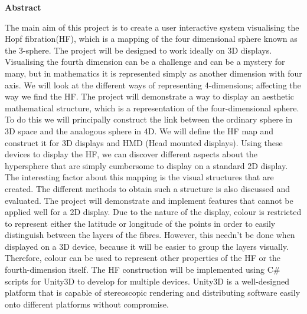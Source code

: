 \documentclass[12pt]{article} %
\begin{document}
\newpage %
\begin{center}
\vspace{0.9cm}
\textbf{Abstract}
\end{center}
\begin{flushleft}
The main aim of this project is to create a user interactive system visualising the Hopf fibration(HF), which is a mapping of the four dimensional sphere known as the 3-sphere. The project will be designed to work ideally on 3D displays. 
Visualising the fourth dimension can be a challenge and can be a mystery for many, but in mathematics it is represented simply as another dimension with four axis. We will look at the different ways of representing 4-dimensions; affecting the way we find the HF. The project will demonstrate a way to display an aesthetic mathematical structure, which is a representation of the four-dimensional sphere. To do this we will principally construct the link between the ordinary sphere in 3D space and the analogous sphere in 4D. We will define the HF map and construct it for 3D displays and HMD (Head mounted displays). Using these devices to display the HF, we can discover different aspects about the hypersphere that are simply cumbersome to display on a standard 2D display.\newline
The interesting factor about this mapping is the visual structures that are created. The different methods to obtain such a structure is also discussed and evaluated.\newline
The project will demonstrate and implement features that cannot be applied well for a 2D display. Due to the nature of the display, colour is restricted to represent either the latitude or longitude of the points in order to easily distinguish between the layers of the fibres. However, this needn't be done when displayed on a 3D device, because it will be easier to group the layers visually. Therefore, colour can be used to represent other properties of the HF or the fourth-dimension itself.\newline
The HF construction will be implemented using C\# scripts for Unity3D to develop for multiple devices. Unity3D is a well-designed platform that is capable of stereoscopic rendering and distributing software easily onto different platforms without compromise.
\vfill


\end{flushleft}
\end{document}
